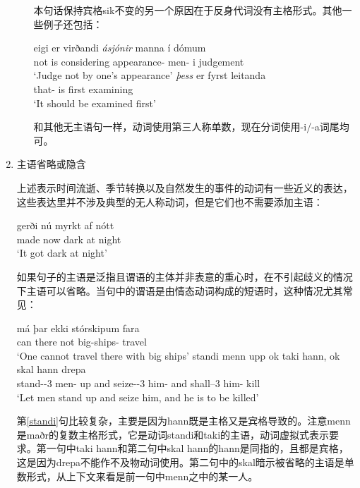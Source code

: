 \begin{enumerate}
\begin{enumerate}
本句话保持宾格sik不变的另一个原因在于反身代词没有主格形式。其他一些例子还包括：
\begin{exe}
\ex \gll
    eigi	er	virðandi	\textit{ásjónir}	manna	í	dómum\\
not	is	considering	appearance-{\acc}	men-{\gen}	i	judgement\\
\trans `Judge not by one’s appearance’
\ex \gll
\textit{þess}	er	fyrst	leitanda\\
that-{\gen}	is	first	examining\\
\trans `It should be examined first’
\end{exe}

和其他无主语句一样，动词使用第三人称单数，现在分词使用-i/-a词尾均可。
\end{enumerate}

    \item 主语省略或隐含

上述表示时间流逝、季节转换以及自然发生的事件的动词有一些近义的表达，这些表达里并不涉及典型的无人称动词，但是它们也不需要添加主语：
\begin{exe}
\ex \gll
gerði	nú	myrkt	af	nótt\\
made	now	dark	at	night\\
\trans `It got dark at night’
\end{exe}

如果句子的主语是泛指且谓语的主体并非表意的重心时，在不引起歧义的情况下主语可以省略。当句中的谓语是由情态动词构成的短语时，这种情况尤其常见：
\begin{exe}
    \ex \gll
    má	þar	ekki	stórskipum	fara\\
can	there	not	big-ships-{\dat}	travel\\
\trans `One cannot travel there with big ships’
\ex \label{standi} \gll
standi	menn	upp	ok	taki	hann, ok	skal	hann	drepa	\\
stand-\sub -{\footnotesize 3} \pl	men-{\nom}	up	and	seize-\sub -{\footnotesize 3} \pl	him-{\acc} and	shall--{\footnotesize 3} {\sing}	him-{\acc}	kill		\\
\trans `Let men stand up and seize him, and he is to be killed’
\end{exe}

第\ref{standi}句比较复杂，主要是因为hann既是主格又是宾格导致的。注意menn是maðr的复数主格形式，它是动词standi和taki的主语，动词虚拟式表示要求。第一句中taki hann和第二句中skal hann的hann是同指的，且都是宾格，这是因为drepa不能作不及物动词使用。第二句中的skal暗示被省略的主语是单数形式，从上下文来看是前一句中menn之中的某一人。


\end{enumerate}
